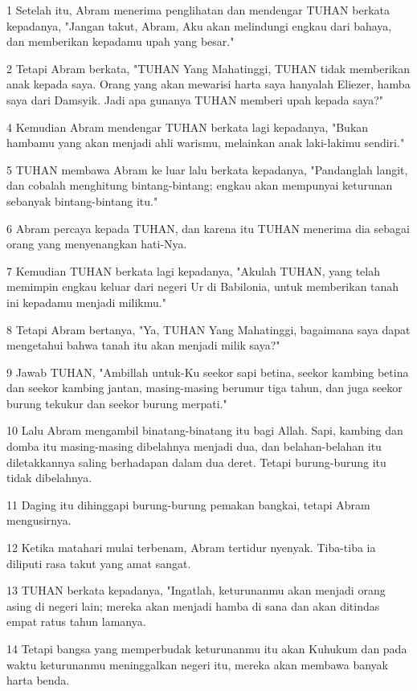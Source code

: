 \par 1 Setelah itu, Abram menerima penglihatan dan mendengar TUHAN berkata kepadanya, "Jangan takut, Abram, Aku akan melindungi engkau dari bahaya, dan memberikan kepadamu upah yang besar."
\par 2 Tetapi Abram berkata, "TUHAN Yang Mahatinggi, TUHAN tidak memberikan anak kepada saya. Orang yang akan mewarisi harta saya hanyalah Eliezer, hamba saya dari Damsyik. Jadi apa gunanya TUHAN memberi upah kepada saya?"
\par 4 Kemudian Abram mendengar TUHAN berkata lagi kepadanya, "Bukan hambamu yang akan menjadi ahli warismu, melainkan anak laki-lakimu sendiri."
\par 5 TUHAN membawa Abram ke luar lalu berkata kepadanya, "Pandanglah langit, dan cobalah menghitung bintang-bintang; engkau akan mempunyai keturunan sebanyak bintang-bintang itu."
\par 6 Abram percaya kepada TUHAN, dan karena itu TUHAN menerima dia sebagai orang yang menyenangkan hati-Nya.
\par 7 Kemudian TUHAN berkata lagi kepadanya, "Akulah TUHAN, yang telah memimpin engkau keluar dari negeri Ur di Babilonia, untuk memberikan tanah ini kepadamu menjadi milikmu."
\par 8 Tetapi Abram bertanya, "Ya, TUHAN Yang Mahatinggi, bagaimana saya dapat mengetahui bahwa tanah itu akan menjadi milik saya?"
\par 9 Jawab TUHAN, "Ambillah untuk-Ku seekor sapi betina, seekor kambing betina dan seekor kambing jantan, masing-masing berumur tiga tahun, dan juga seekor burung tekukur dan seekor burung merpati."
\par 10 Lalu Abram mengambil binatang-binatang itu bagi Allah. Sapi, kambing dan domba itu masing-masing dibelahnya menjadi dua, dan belahan-belahan itu diletakkannya saling berhadapan dalam dua deret. Tetapi burung-burung itu tidak dibelahnya.
\par 11 Daging itu dihinggapi burung-burung pemakan bangkai, tetapi Abram mengusirnya.
\par 12 Ketika matahari mulai terbenam, Abram tertidur nyenyak. Tiba-tiba ia diliputi rasa takut yang amat sangat.
\par 13 TUHAN berkata kepadanya, "Ingatlah, keturunanmu akan menjadi orang asing di negeri lain; mereka akan menjadi hamba di sana dan akan ditindas empat ratus tahun lamanya.
\par 14 Tetapi bangsa yang memperbudak keturunanmu itu akan Kuhukum dan pada waktu keturunanmu meninggalkan negeri itu, mereka akan membawa banyak harta benda.
